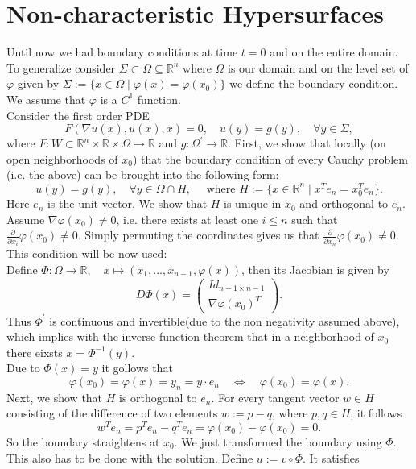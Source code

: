 \documentclass[A4,12pt,twoside]{book}
\begin{document}
\section{Non-characteristic Hypersurfaces}
Until now we had boundary conditions at time $t=0$ and on the entire domain. To generalize consider $\Sigma \subset \Omega \subseteq \mathbb{R}^n$ where $\Omega$ is our domain and on the level set of $\varphi$ given by $\Sigma :=\{ x \in \Omega \mid \varphi (x) = \varphi (x_0) \}$ we define the boundary condition. We assume that $\varphi$ is a $C^1$ function. \\
Consider the first order PDE 
\[
F(\nabla u (x), u(x), x)=0, \quad u(y) = g(y), \quad \forall y \in \Sigma,
\]
where $F: W \subset \mathbb{R}^n \times \mathbb{R} \times \Omega \to \mathbb{R}$ and $g: \Omega^\prime \to \mathbb{R}$. First, we show that locally (on open neighborhoods of $x_0$) that the boundary condition of every Cauchy problem (i.e. the above) can be brought into the following form:
\[
u(y) = g(y), \quad \forall y \in \Omega \cap H, \quad \text{ where } 
H:= \{ x \in \mathbb{R}^n \mid x^T e_n = x_0^T e_n \}.
\]
Here $e_n$ is the unit vector. We show that $H$ is unique in $x_0$ and orthogonal to $e_n$. \\
Assume $\nabla \varphi (x_0) \neq 0$, i.e. there exists at least one $i\leq n$ such that $\frac{\partial}{\partial x_i} \varphi(x_0) \neq 0$. Simply permuting the coordinates gives us that $\frac{\partial}{\partial x_n} \varphi(x_0) \neq 0$. This condition will be now used:\\
Define $\Phi: \Omega \to \mathbb{R}, \quad x \mapsto (x_1,...,x_{n-1},\varphi (x))$, then its Jacobian is given by 
\[
D \Phi (x) = \begin{pmatrix}
    Id_{n-1 \times n-1}\\
    \nabla \varphi (x_0)^T
\end{pmatrix}.
\]
Thus $\Phi^\prime$ is continuous and invertible(due to the non negativity assumed above), which implies with the inverse function theorem that in a neighborhood of $x_0$ there eixsts $x= \Phi^{-1} (y)$.\\
Due to $\Phi (x) =y$ it gollows that 
\[
\varphi (x_0) = \varphi (x) = y_n = y \cdot e_n \quad \iff \quad \varphi (x_0) = \varphi (x).
\]
Next, we show that $H$ is orthogonal to $e_n$. For every tangent vector $w \in H$ consisting of the difference of two elements $w:= p-q$, where $p,q \in H$, it follows 
\[
w^T e_n = p^T e_n - q^T e_n = \varphi (x_0)-\varphi (x_0)=0.
\]
So the boundary straightens at $x_0$. We just transformed the boundary using $\Phi$. This also has to be done with the solution. Define $u:= v \circ \Phi$. It satisfies 
\end{document}
